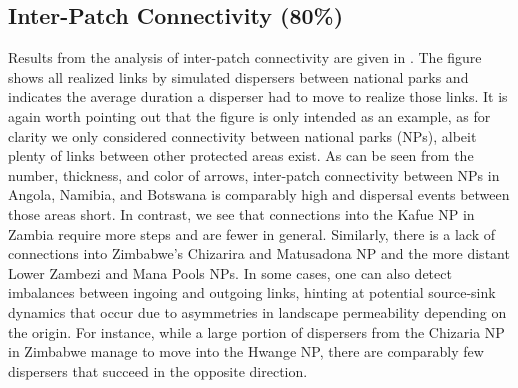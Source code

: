 \documentclass[abstract=on,10pt,a4paper,bibliography=totocnumbered]{article}
\begin{document}
\subsection{Inter-Patch Connectivity (80\%)}
Results from the analysis of inter-patch connectivity are given in
. The figure shows all realized links by simulated dispersers
between national parks and indicates the average duration a disperser had to
move to realize those links. It is again worth pointing out that the figure is
only intended as an example, as for clarity we only considered connectivity
between national parks (NPs), albeit plenty of links between other protected
areas exist. As can be seen from the number, thickness, and color of arrows,
inter-patch connectivity between NPs in Angola, Namibia, and Botswana is
comparably high and dispersal events between those areas short. In contrast, we
see that connections into the Kafue NP in Zambia require more steps and are
fewer in general. Similarly, there is a lack of connections into Zimbabwe's
Chizarira and Matusadona NP and the more distant Lower Zambezi and Mana Pools
NPs. In some cases, one can also detect imbalances between ingoing and outgoing
links, hinting at potential source-sink dynamics that occur due to asymmetries
in landscape permeability depending on the origin. For instance, while a large
portion of dispersers from the Chizaria NP in Zimbabwe manage to move into the
Hwange NP, there are comparably few dispersers that succeed in the opposite
direction.

\end{document}

